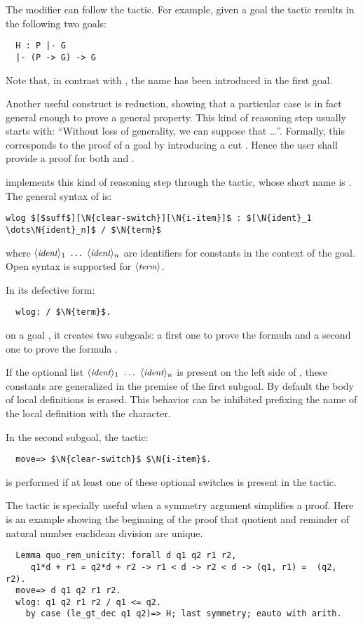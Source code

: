 The  modifier can follow the  tactic.
For example, given a goal  the tactic
 results in the following two goals:
\begin{lstlisting}
  H : P |- G
  |- (P -> G) -> G
\end{lstlisting}
Note that, in contrast with , the name  has been introduced
in the first goal.

Another useful construct is reduction,
showing that a particular case is in fact general enough to prove
a general property. This kind of reasoning step usually starts with:
``Without loss of generality, we can suppose that \dots''.
Formally, this corresponds to the proof of a goal  by introducing
a cut . Hence the user shall provide a
proof for both  and
.

\ssr{} implements this kind of reasoning step through the 
tactic, whose short name is .
The general syntax of  is:
\begin{lstlisting}
wlog $[$suff$][\N{clear-switch}][\N{i-item}]$ : $[\N{ident}_1 \dots\N{ident}_n]$ / $\N{term}$
\end{lstlisting}
where $\N{ident}_1\ \dots\ \N{ident}_n$ are identifiers for constants
in the context of the goal. Open syntax is supported for $\langle\mbox{\itshape\rmfamily\small term}\rangle$.

In its defective form:
\begin{lstlisting}
  wlog: / $\N{term}$.
\end{lstlisting}
on a goal , it creates two subgoals: a first one to prove the formula
 and a second one to prove the formula
.

If the optional list $\N{ident}_1\ \dots\ \N{ident}_n$ is present on the left
side of \C{/}, these constants are generalized in the premise
 of the first subgoal. By default the body of
local definitions  is erased. This behavior can be inhibited
prefixing the name of the local definition with the  character.

In the second subgoal, the tactic:
\begin{lstlisting}
  move=> $\N{clear-switch}$ $\N{i-item}$.
\end{lstlisting}
is performed if at least one of these optional switches is present in
the  tactic.

The  tactic is specially useful when a symmetry argument
simplifies a proof. Here is an example showing the beginning of the
proof that quotient and reminder of natural number euclidean division
are unique.
\begin{lstlisting}
  Lemma quo_rem_unicity: forall d q1 q2 r1 r2,
     q1*d + r1 = q2*d + r2 -> r1 < d -> r2 < d -> (q1, r1) =  (q2, r2).
  move=> d q1 q2 r1 r2.
  wlog: q1 q2 r1 r2 / q1 <= q2.
    by case (le_gt_dec q1 q2)=> H; last symmetry; eauto with arith.
\end{lstlisting}

